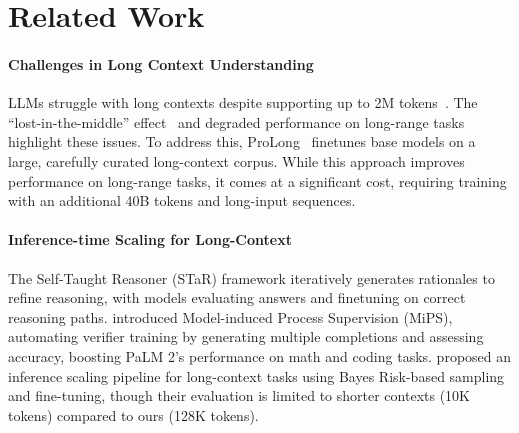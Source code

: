 \section{Related Work}
\label{sec:related_work}
\paragraph{Challenges in Long Context Understanding}
LLMs struggle with long contexts despite supporting up to 2M tokens~\cite{dubey2024llama3,reid2024gemini}. 
The ``lost-in-the-middle'' effect~\cite{liu2024lost} and degraded performance on long-range tasks~\cite{li2023loogle} highlight these issues. To address this, ProLong~\cite{prolong} finetunes base models on a large, carefully curated long-context corpus. While this approach improves performance on long-range tasks, it comes at a significant cost, requiring training with an additional 40B tokens and long-input sequences.




\paragraph{Inference-time Scaling for Long-Context}
The Self-Taught Reasoner (STaR) framework \citep{zelikman2022star} iteratively generates rationales to refine reasoning, with models evaluating answers and finetuning on correct reasoning paths. \citet{wang2024multi} introduced Model-induced Process Supervision (MiPS), automating verifier training by generating multiple completions and assessing accuracy, boosting PaLM 2's performance on math and coding tasks. \citet{li2024large} proposed an inference scaling pipeline for long-context tasks using Bayes Risk-based sampling and fine-tuning, though their evaluation is limited to shorter contexts (10K tokens) compared to ours (128K tokens).

